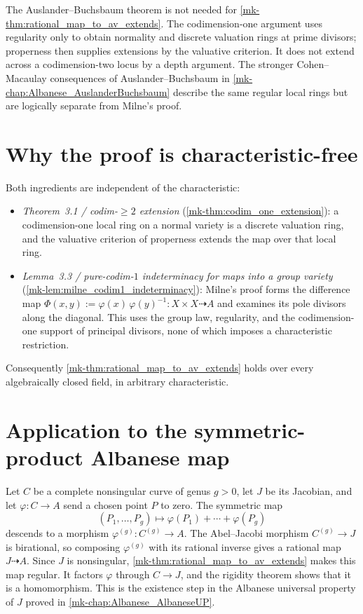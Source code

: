 \begin{remark}
  \label{mk-rmk:thm32_role_of_ab}
  The Auslander--Buchsbaum theorem is not needed for
  \ref{mk-thm:rational_map_to_av_extends}.  The codimension-one argument uses
  regularity only to obtain normality and discrete valuation rings at prime
  divisors; properness then supplies extensions by the valuative criterion.
  It does not extend across a codimension-two locus by a depth argument.
  The stronger Cohen--Macaulay consequences of Auslander--Buchsbaum in
  \ref{mk-chap:Albanese_AuslanderBuchsbaum} describe the same regular local
  rings but are logically separate from Milne's proof.
\end{remark}

\section{Why the proof is characteristic-free}
\label{mk-sec:thm32_char_free}

Both ingredients are independent of the characteristic:
\begin{itemize}
  \item \emph{Theorem~3.1 / codim-\(\geq 2\) extension} (\ref{mk-thm:codim_one_extension}):
    a codimension-one local ring on a normal variety is a discrete valuation
    ring, and the valuative criterion of properness extends the map over that
    local ring.
  \item \emph{Lemma~3.3 / pure-codim-\(1\) indeterminacy for maps into a group variety}
    (\ref{mk-lem:milne_codim1_indeterminacy}): Milne's proof forms the difference map
    \(\Phi(x, y) := \varphi(x)\,\varphi(y)^{-1} \colon X \times X \dashrightarrow A\) and
    examines its pole divisors along the diagonal.  This uses the group law,
    regularity, and the codimension-one support of principal divisors, none
    of which imposes a characteristic restriction.
\end{itemize}
Consequently \ref{mk-thm:rational_map_to_av_extends} holds over every algebraically closed
field, in arbitrary characteristic.

\section{Application to the symmetric-product Albanese map}
\label{mk-sec:thm32_application_to_a4d}

Let \(C\) be a complete nonsingular curve of genus \(g>0\), let \(J\) be
its Jacobian, and let \(\varphi\colon C\to A\) send a chosen point \(P\) to
zero.  The symmetric map
\[
  (P_1,\ldots,P_g)\longmapsto
  \varphi(P_1)+\cdots+\varphi(P_g)
\]
descends to a morphism \(\varphi^{(g)}\colon C^{(g)}\to A\).  The
Abel--Jacobi morphism \(C^{(g)}\to J\) is birational, so composing
\(\varphi^{(g)}\) with its rational inverse gives a rational map
\(J\dashrightarrow A\).  Since \(J\) is nonsingular,
\ref{mk-thm:rational_map_to_av_extends} makes this map regular.  It factors
\(\varphi\) through \(C\to J\), and the rigidity theorem shows that it is a
homomorphism.  This is the existence step in the Albanese universal property
of \(J\) proved in \ref{mk-chap:Albanese_AlbaneseUP}.

